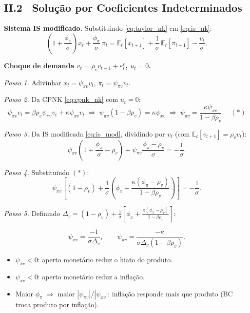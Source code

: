 \documentclass[12pt, a4paper]{article}
\newcommand{\E}{\mathbb{E}}
\begin{document}
\subsection*{II.2 \ Solução por Coeficientes Indeterminados}

\textbf{Sistema IS modificado.}
Substituindo \eqref{eq:taylor_nk} em \eqref{eq:is_nk}:
\begin{equation}
\left(1 + \frac{\phi_x}{\sigma}\right)x_t + \frac{\phi_\pi}{\sigma}\,\pi_t
= \E_t[x_{t+1}] + \frac{1}{\sigma}\,\E_t[\pi_{t+1}] - \frac{v_t}{\sigma}.
\label{eq:is_mod}
\end{equation}

\textbf{Choque de demanda $v_t = \rho_v v_{t-1} + \varepsilon_t^v$, $u_t=0$.}

\textit{Passo 1.} Adivinhar $x_t = \psi_{xv}v_t$, $\pi_t = \psi_{\pi v}v_t$.

\textit{Passo 2.} Da CPNK \eqref{eq:cpnk_nk} com $u_t=0$:
\[
\psi_{\pi v}v_t = \beta\rho_v\psi_{\pi v}v_t + \kappa\psi_{xv}v_t
\;\Rightarrow\;
\psi_{\pi v}(1-\beta\rho_v) = \kappa\psi_{xv}
\;\Rightarrow\;
\psi_{\pi v} = \frac{\kappa\psi_{xv}}{1-\beta\rho_v}. \quad (*)
\]

\textit{Passo 3.} Da IS modificada \eqref{eq:is_mod}, dividindo por $v_t$
(com $\E_t[v_{t+1}]=\rho_v v_t$):
\[
\psi_{xv}\!\left(1 + \frac{\phi_x}{\sigma} - \rho_v\right)
+ \psi_{\pi v}\!\frac{\phi_\pi - \rho_v}{\sigma} = -\frac{1}{\sigma}.
\]

\textit{Passo 4.} Substituindo $(*)$:
\[
\psi_{xv}\!\left[(1-\rho_v) + \frac{1}{\sigma}\!\left(\phi_x
  + \frac{\kappa(\phi_\pi-\rho_v)}{1-\beta\rho_v}\right)\right] = -\frac{1}{\sigma}.
\]

\textit{Passo 5.} Definindo $\Delta_v = (1-\rho_v) + \frac{1}{\sigma}\!\left[\phi_x + \frac{\kappa(\phi_\pi-\rho_v)}{1-\beta\rho_v}\right]$:

\begin{formulabox}[title={Solução para choque de demanda $v_t$}]
\[
\boxed{
\psi_{xv} = \frac{-1}{\sigma\Delta_v},\qquad
\psi_{\pi v} = \frac{-\kappa}{\sigma\Delta_v(1-\beta\rho_v)}.
}
\]
\begin{itemize}[leftmargin=1.5em, itemsep=2pt]
  \item $\psi_{xv} < 0$: aperto monetário reduz o hiato do produto.
  \item $\psi_{\pi v} < 0$: aperto monetário reduz a inflação.
  \item Maior $\phi_\pi$ $\Rightarrow$ maior $|\psi_{\pi v}|/|\psi_{xv}|$: inflação
        responde mais que produto (BC troca produto por inflação).
\end{itemize}
\end{formulabox}
\end{document}
